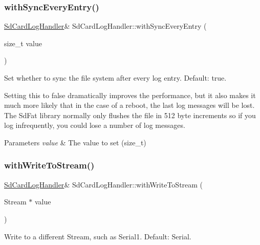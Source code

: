 \subsubsection{\texorpdfstring{with\+Sync\+Every\+Entry()}{withSyncEveryEntry()}}
{\footnotesize\ttfamily \mbox{\hyperlink{class_sd_card_log_handler}{Sd\+Card\+Log\+Handler}}\& Sd\+Card\+Log\+Handler\+::with\+Sync\+Every\+Entry (\begin{DoxyParamCaption}\item[{size\+\_\+t}]{value }\end{DoxyParamCaption})\hspace{0.3cm}{\ttfamily [inline]}}



Set whether to sync the file system after every log entry. Default\+: true. 

Setting this to false dramatically improves the performance, but it also makes it much more likely that in the case of a reboot, the last log messages will be lost. The Sd\+Fat library normally only flushes the file in 512 byte increments so if you log infrequently, you could lose a number of log messages.


\begin{DoxyParams}{Parameters}
{\em value} & The value to set (size\+\_\+t) \\
\hline
\end{DoxyParams}
\mbox{\label{class_sd_card_log_handler_aca341088fe42f1e1dcfbabfbce0da529}} 
\subsubsection{\texorpdfstring{with\+Write\+To\+Stream()}{withWriteToStream()}}
{\footnotesize\ttfamily \mbox{\hyperlink{class_sd_card_log_handler}{Sd\+Card\+Log\+Handler}}\& Sd\+Card\+Log\+Handler\+::with\+Write\+To\+Stream (\begin{DoxyParamCaption}\item[{Stream $\ast$}]{value }\end{DoxyParamCaption})\hspace{0.3cm}{\ttfamily [inline]}}



Write to a different Stream, such as Serial1. Default\+: Serial. 


